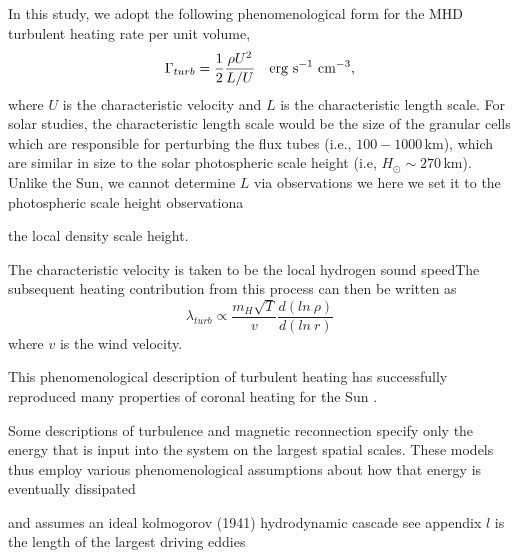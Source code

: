 In this study, we adopt the following phenomenological form for the MHD turbulent heating rate per unit volume,
\begin{equation}
\Gamma_{turb} =\frac{1}{2}\frac{\rho U^{2}}{L/U}\ \ \ \rm{erg \ s^{-1} \ cm^{-3}},
\end{equation} 
where $U$ is the characteristic velocity and $L$ is the characteristic length scale. For solar studies, the characteristic length scale would be the size of the granular cells which are responsible for perturbing the flux tubes (i.e., $100-1000$\,km), which are similar in size to the solar photospheric scale height (i.e, $H_{\odot} \sim 270$\,km). Unlike the Sun, we cannot determine $L$ via observations we here we set it to the photospheric scale height observationa 

 the local density scale height. 



The characteristic velocity is taken to be the local hydrogen sound speedThe subsequent heating contribution from this process can then be written as
\begin{equation}
\lambda_{turb} \propto \frac{m_{H}\sqrt{T}}{v}\frac{d(ln\ \rho)}{d(ln\ r)}
\end{equation} 
where $v$ is the wind velocity. 

This phenomenological description of turbulent heating has successfully reproduced many properties of coronal heating for the Sun \citep{cranmer_2012}.

Some descriptions of turbulence
and magnetic reconnection specify only the energy that is input into the system on
the largest spatial scales. These models thus employ various phenomenological assumptions
about how that energy is eventually dissipated

and assumes an ideal kolmogorov (1941) hydrodynamic cascade see appendix
$l$ is the length of the largest driving eddies

